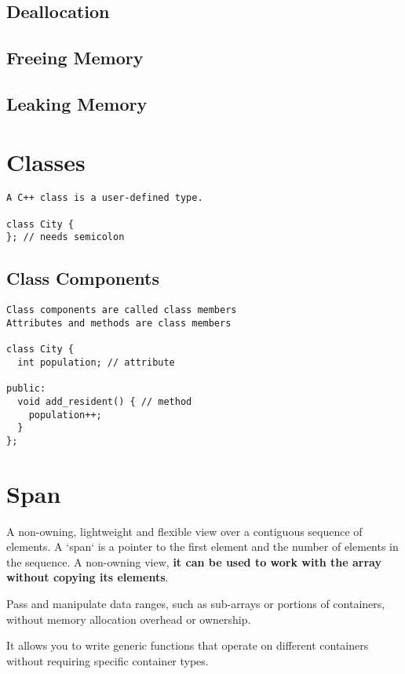 \documentclass[openany]{report}
\begin{document}
\subsection{Deallocation}

\subsection{Freeing Memory}
\subsection{Leaking Memory}

\section{Classes}

\begin{verbatim}
A C++ class is a user-defined type.

class City {
}; // needs semicolon
\end{verbatim}

\subsection{Class Components}

\begin{verbatim}
Class components are called class members
Attributes and methods are class members

class City {
  int population; // attribute
 
public:
  void add_resident() { // method
    population++;
  }
};
\end{verbatim}


\section{Span}

A non-owning, lightweight and flexible view over a contiguous sequence of elements.
A `span` is a pointer to the first element and the number of elements in the sequence.
A non-owning view, \textbf{it can be used to work with the array without copying its elements}.

Pass and manipulate data ranges, such as sub-arrays or portions of containers,
without memory allocation overhead or ownership.

It allows you to write generic functions that operate on different containers
without requiring specific container types.
\end{document}
